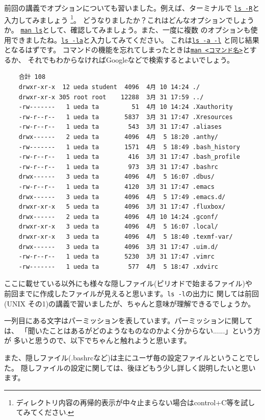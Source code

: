 \documentclass[a4j]{ltjreport}
\begin{document}
    前回の講義でオプションについても習いました。例えば、ターミナルで
    \underline{\texttt{ls -R}}と
    入力してみましょう
    \footnote{ディレクトリ内容の再帰的表示が中々止まらない場合はcontrol+C等を試してみてください.}。
    どうなりましたか？これはどんなオプションでしょうか。
    \underline{\texttt{man ls}}として、確認してみましょう。また、一度に複数
    のオプションも使用できましたね。\underline{\texttt{ls -la}}と入力してみてください。
    これは\underline{\texttt{ls -a -l}} と同じ結果となるはずです。
    コマンドの機能を忘れてしまったときは\underline{\texttt{man <コマンド名>}}とするか、
    それでもわからなければGoogleなどで検索するとよいでしょう。
    \begin{verbatim}
    合計 108
    drwxr-xr-x  12 ueda student  4096  4月 10 14:24 ./
    drwxr-xr-x 305 root root    12288  3月 31 17:59 ../
    -rw-------   1 ueda ta         51  4月 10 14:24 .Xauthority
    -rw-r--r--   1 ueda ta       5837  3月 31 17:47 .Xresources
    -rw-r--r--   1 ueda ta        543  3月 31 17:47 .aliases
    drwx------   2 ueda ta       4096  4月  5 18:20 .anthy/
    -rw-------   1 ueda ta       1571  4月  5 18:49 .bash_history
    -rw-r--r--   1 ueda ta        416  3月 31 17:47 .bash_profile
    -rw-r--r--   1 ueda ta        973  3月 31 17:47 .bashrc
    drwx------   3 ueda ta       4096  4月  5 16:07 .dbus/
    -rw-r--r--   1 ueda ta       4120  3月 31 17:47 .emacs
    drwx------   3 ueda ta       4096  4月  5 17:49 .emacs.d/
    drwxr-xr-x   5 ueda ta       4096  3月 31 17:47 .fluxbox/
    drwx------   2 ueda ta       4096  4月 10 14:24 .gconf/
    drwxr-xr-x   3 ueda ta       4096  4月  5 16:07 .local/
    drwxr-xr-x   3 ueda ta       4096  4月  5 18:40 .texmf-var/
    drwx------   3 ueda ta       4096  3月 31 17:47 .uim.d/
    -rw-r--r--   1 ueda ta       5230  3月 31 17:47 .vimrc
    -rw-------   1 ueda ta        577  4月  5 18:47 .xdvirc
    \end{verbatim}

    ここに載せている以外にも様々な隠しファイル(ピリオドで始まるファイル)や
    前回までに作成したファイルが見えると思います。\verb+ls -l+の出力に
    関しては前回(UNIX その1)の講義で習いましたが、ちゃんと意味が理解できるでしょうか。

    一列目にある文字はパーミッションを表しています。パーミッションに関しては、
    「聞いたことはあるがどのようなものなのかよく分からない......」という方が
    多いと思うので、以下でちゃんと触れようと思います。

    また、隠しファイル(.bashrcなど)は主にユーザ毎の設定ファイルということでした。
    隠しファイルの設定に関しては、後ほどもう少し詳しく説明したいと思います。
\end{document}

